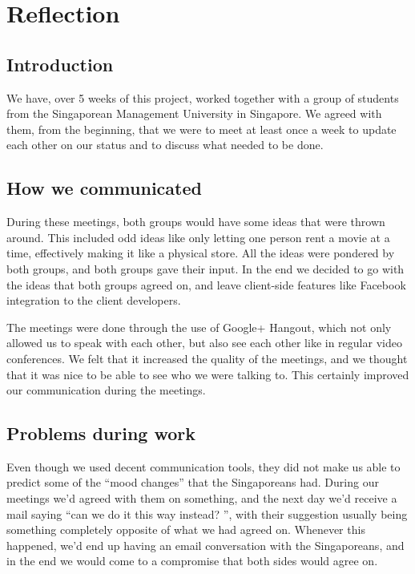 \chapter{Reflection}
\section{Introduction}
\label{reflection_introduction}
We have, over 5 weeks of this project, worked together with a group of students from the Singaporean Management University in Singapore. We agreed with them, from the beginning, that we were to meet at least once a week to update each other on our status and to discuss what needed to be done.

\section{How we communicated}
\label{reflection_communicated}
During these meetings, both groups would have some ideas that were thrown around. This included odd ideas like only letting one person rent a movie at a time, effectively making it like a physical store. All the ideas were pondered by both groups, and both groups gave their input. In the end we decided to go with the ideas that both groups agreed on, and leave client-side features like Facebook integration to the client developers.

The meetings were done through the use of Google+ Hangout, which not only allowed us to speak with each other, but also see each other like in regular video conferences. We felt that it increased the quality of the meetings, and we thought that it was nice to be able to see who we were talking to. This certainly improved our communication during the meetings.

\section{Problems during work}
\label{reflection_problems}
Even though we used decent communication tools, they did not make us able to predict some of the ``mood changes'' that the Singaporeans had. During our meetings we'd agreed with them on something, and the next day we'd receive a mail saying ``can we do it this way instead? '', with their suggestion usually being something completely opposite of what we had agreed on. Whenever this happened, we'd end up having an email conversation with the Singaporeans, and in the end we would come to a compromise that both sides would agree on.

